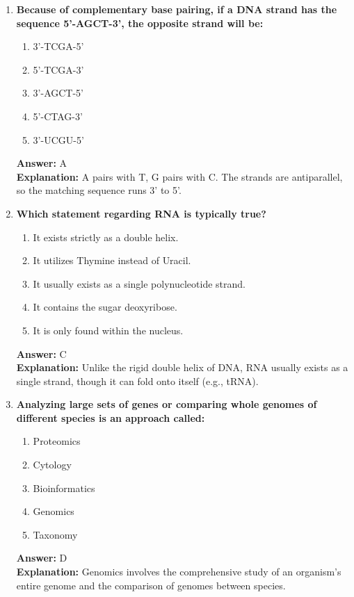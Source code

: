 \documentclass[11pt, a4paper]{article}
\begin{document}
\begin{enumerate}
\item \textbf{Because of complementary base pairing, if a DNA strand has the sequence 5'-AGCT-3', the opposite strand will be:}
\begin{enumerate}[label=\Alph*.]
    \item 3'-TCGA-5'
    \item 5'-TCGA-3'
    \item 3'-AGCT-5'
    \item 5'-CTAG-3'
    \item 3'-UCGU-5'
\end{enumerate}
\textbf{Answer:} A \\
\textbf{Explanation:} A pairs with T, G pairs with C. The strands are antiparallel, so the matching sequence runs 3' to 5'.

\item \textbf{Which statement regarding RNA is typically true?}
\begin{enumerate}[label=\Alph*.]
    \item It exists strictly as a double helix.
    \item It utilizes Thymine instead of Uracil.
    \item It usually exists as a single polynucleotide strand.
    \item It contains the sugar deoxyribose.
    \item It is only found within the nucleus.
\end{enumerate}
\textbf{Answer:} C \\
\textbf{Explanation:} Unlike the rigid double helix of DNA, RNA usually exists as a single strand, though it can fold onto itself (e.g., tRNA).


\item \textbf{Analyzing large sets of genes or comparing whole genomes of different species is an approach called:}
\begin{enumerate}[label=\Alph*.]
    \item Proteomics
    \item Cytology
    \item Bioinformatics
    \item Genomics
    \item Taxonomy
\end{enumerate}
\textbf{Answer:} D \\
\textbf{Explanation:} Genomics involves the comprehensive study of an organism's entire genome and the comparison of genomes between species.


\end{enumerate}
\end{document}
